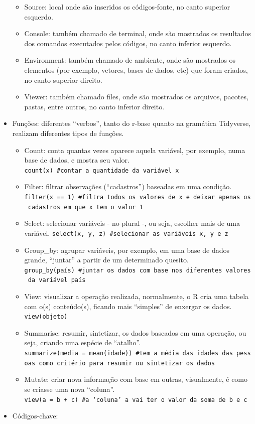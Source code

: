 \documentclass[
  brazil,
]{book}
\providecommand{\tightlist}{%
  \setlength{\itemsep}{0pt}\setlength{\parskip}{0pt}}
\begin{document}
\begin{itemize}
  \begin{itemize}
  \tightlist
  \item
    Source: local onde são inseridos os códigos-fonte, no canto superior esquerdo.
  \item
    Console: também chamado de terminal, onde são mostrados os resultados dos comandos executados pelos códigos, no canto inferior esquerdo.
  \item
    Environment: também chamado de ambiente, onde são mostrados os elementos (por exemplo, vetores, bases de dados, etc) que foram criados, no canto superior direito.
  \item
    Viewer: também chamado files, onde são mostrados os arquivos, pacotes, pastas, entre outros, no canto inferior direito.
  \end{itemize}
\item
  Funções: diferentes ``verbos'', tanto do r-base quanto na gramática Tidyverse, realizam diferentes tipos de funções.

  \begin{itemize}
  \tightlist
  \item
    Count: conta quantas vezes aparece aquela variável, por exemplo, numa base de dados, e mostra seu valor. \texttt{count(x)\ \#contar\ a\ quantidade\ da\ variável\ x}
  \item
    Filter: filtrar observações (``cadastros'') baseadas em uma condição. \texttt{filter(x\ ==\ 1)\ \#filtra\ todos\ os\ valores\ de\ x\ e\ deixar\ apenas\ os\ cadastros\ em\ que\ x\ tem\ o\ valor\ 1}
  \item
    Select: selecionar variáveis - no plural -, ou seja, escolher mais de uma variável. \texttt{select(x,\ y,\ z)\ \#selecionar\ as\ variáveis\ x,\ y\ e\ z}
  \item
    Group\_by: agrupar variáveis, por exemplo, em uma base de dados grande, ``juntar'' a partir de um determinado quesito. \texttt{group\_by(país)\ \#juntar\ os\ dados\ com\ base\ nos\ diferentes\ valores\ da\ variável\ país}
  \item
    View: visualizar a operação realizada, normalmente, o R cria uma tabela com o(s) conteúdo(s), ficando mais ``simples'' de enxergar os dados. \texttt{view(objeto)}
  \item
    Summarise: resumir, sintetizar, os dados baseados em uma operação, ou seja, criando uma espécie de ``atalho''. \texttt{summarize(media\ =\ mean(idade))\ \#tem\ a\ média\ das\ idades\ das\ pessoas\ como\ critério\ para\ resumir\ ou\ sintetizar\ os\ dados}
  \item
    Mutate: criar nova informação com base em outras, visualmente, é como se criasse uma nova ``coluna''. \texttt{view(a\ =\ b\ +\ c)\ \#a\ ‘coluna’\ a\ vai\ ter\ o\ valor\ da\ soma\ de\ b\ e\ c}
  \end{itemize}
\item
  Códigos-chave:


\end{itemize}
\end{document}
